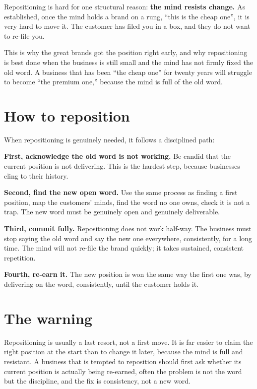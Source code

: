 \documentclass[10pt,twoside,openany]{memoir}
\newcommand{\needspacehead}{\needspace{4\baselineskip}}
\let\oldsection\section
\renewcommand{\section}{\needspacehead\oldsection}
\begin{document}
{Repositioning is hard for one structural reason: \textbf{the mind
resists change.} As established, once the mind holds a brand on a rung,
``this is the cheap one'', it is very hard to move it. The customer has
filed you in a box, and they do not want to re-file you.

This is why the great brands got the position right early, and why
repositioning is best done when the business is still small and the mind
has not firmly fixed the old word. A business that has been ``the cheap
one'' for twenty years will struggle to become ``the premium one,''
because the mind is full of the old word.

\section{How to reposition}\label{how-to-reposition}

When repositioning is genuinely needed, it follows a disciplined path:

\textbf{First, acknowledge the old word is not working.} Be candid that
the current position is not delivering. This is the hardest step,
because businesses cling to their history.

\textbf{Second, find the new open word.} Use the same process as finding
a first position, map the customers' minds, find the word no one owns,
check it is not a trap. The new word must be genuinely open and
genuinely deliverable.

\textbf{Third, commit fully.} Repositioning does not work half-way. The
business must stop saying the old word and say the new one everywhere,
consistently, for a long time. The mind will not re-file the brand
quickly; it takes sustained, consistent repetition.

\textbf{Fourth, re-earn it.} The new position is won the same way the
first one was, by delivering on the word, consistently, until the
customer holds it.

\section{The warning}\label{the-warning}

Repositioning is usually a last resort, not a first move. It is far
easier to claim the right position at the start than to change it later,
because the mind is full and resistant. A business that is tempted to
reposition should first ask whether its current position is actually
being re-earned, often the problem is not the word but the discipline,
and the fix is consistency, not a new word.

}
\end{document}
